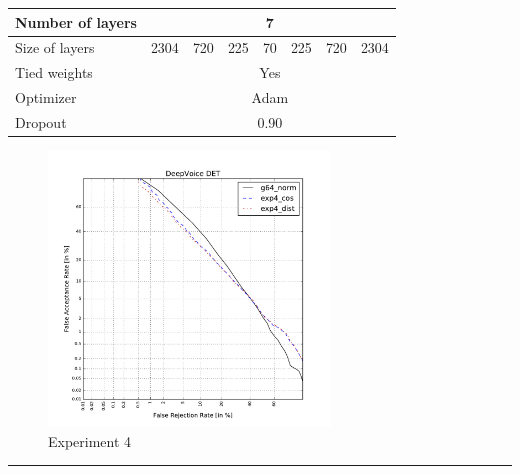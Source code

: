 \documentclass[conference]{IEEEtran}
\begin{document}
\newpage

\begin{table}[!h]
\centering
\begin{tabular}{|l|c|c|c|c|c|c|c|}
\hline
Number of layers & \multicolumn{7}{c|}{7}                \\ \hline
Size of layers   & 2304 & 720 & 225 & 70 & 225 & 720 & 2304  \\ \hline
Tied weights     & \multicolumn{7}{c|}{Yes}               \\ \hline
Optimizer        & \multicolumn{7}{c|}{Adam} \\ \hline
Dropout          & \multicolumn{7}{c|}{0.90} \\ \hline
\end{tabular}
\end{table}


\begin{figure}[!h]
    \centering
    \includegraphics[width=7.5cm]{../scores/det4.pdf}
    \captionsetup{labelformat=empty}
    \caption{Experiment 4}
\end{figure}

\hrule
\vspace{0.5cm}


\end{document}
